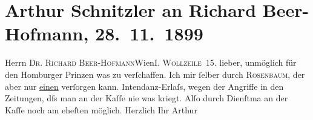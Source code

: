 

         
         \renewcommand{\erwaehntePersonen}{Personen: Richard Beer-Hofmann, Richard Rosenbaum}
         \renewcommand{\erwaehnteOrte}{Orte: I., Innere Stadt, Wien, Wollzeile}
         \renewcommand{\erwaehnteWerke}{Werke: Prinz Friedrich von Homburg oder die Schlacht bei Fehrbellin}
               \section[Arthur Schnitzler an Richard Beer-Hofmann, 28. 11. 1899]{ Arthur Schnitzler an Richard Beer-Hofmann, 28. 11. 1899}\nopagebreak{}\rehead{ }\begin{ledgroupsized}[t]{13cm}\normalsize\beginnumbering \toendnotes[C]{\smallbreak\pagebreak[2]} 
\pstart{}{\pb}Herrn \textsc{Dr. Richard
                     Beer-Hofmann}\pend{}\pstart{}Wien\pend{}\pstart{}\textsc{I. Wollzeile 15}.\pend{}{\bigskip}\pstart
           \noindent{}{\pb}lieber, unmöglich für den Homburger
                  Prinzen was zu verſchaffen. Ich mir ſelber durch \textsc{Rosenbaum}, der aber nur \uline{einen} verſorgen kann.
               Intendanz-Erlaſs, wegen der Angriffe in den Zeitungen, dſs man an der Kaſſe nie was
               kriegt. Alſo durch Dienſtma{\geminationn} an der Kaſſe noch am
               eheſten möglich.\pend
           \pstart Herzlich Ihr \spacefill\mbox{Arthur}\pend{}
         
         \endnumbering{}\end{ledgroupsized}  \newcommand{\dateiname}{L01002}\newcommand{\titel}{Arthur Schnitzler an Richard Beer-Hofmann, 28. 11. 1899}\newcommand{\editorInnen}{Martin Anton Müller und Gerd-Hermann Susen}
      